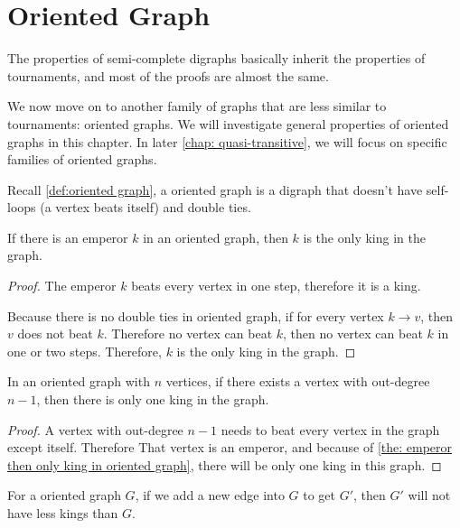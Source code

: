 \chapter{Oriented Graph}\label{chap: general oriented graph}

The properties of semi-complete digraphs basically inherit
the properties of tournaments,
and most of the proofs are almost the same.

We now move on to another family of graphs that are less
similar to tournaments: oriented graphs.
We will investigate general properties of oriented graphs
in this chapter.
In later \cref{chap: quasi-transitive}, we will focus on
specific families of oriented graphs.

Recall \cref{def:oriented graph},
a oriented graph is a digraph that doesn't
have self-loops (a vertex beats itself)
and double ties.

\begin{theorem}\label{the: emperor then only king in oriented graph}
  If there is an emperor \(k\) in an oriented graph,
  then \(k\) is the only king in the graph.
\end{theorem}
\begin{proof}
  The emperor \(k\) beats every vertex in one step,
  therefore it is a king.

  Because there is no double ties in oriented graph,
  if for every vertex \(k \to v\),
  then \(v\) does not beat \(k\).
  Therefore no vertex can beat \(k\),
  then no vertex can beat \(k\) in one or two steps.
  Therefore, \(k\) is the only king in the graph.
\end{proof}

\begin{corollary}\label{the: if vertex with out-degree n-1 then only one king}
  In an oriented graph with \(n\) vertices,
  if there exists a vertex with out-degree \(n-1\),
  then there is only one king in the graph.
\end{corollary}

\begin{proof}
  A vertex with out-degree \(n-1\) needs to beat every vertex
  in the graph except itself.
  Therefore That vertex is an emperor,
  and because of \cref{the: emperor then only king in oriented graph},
  there will be only one king in this graph.
\end{proof}

\begin{lemma}\label{the: add edge only add king}
  For a oriented graph \(G\),
  if we add a new edge into \(G\) to get \(G'\),
  then \(G'\) will not have less kings than \(G\).
\end{lemma}

